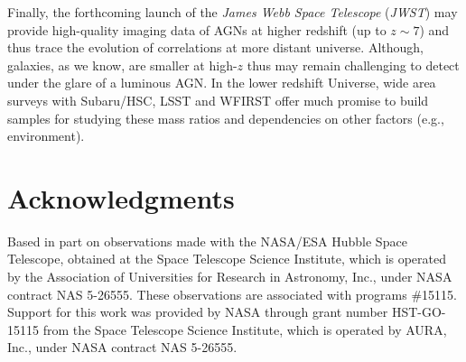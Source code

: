 \documentclass[apj]{emulateapj}
\begin{document}
Finally, the forthcoming launch of the {\it James Webb Space Telescope} ({\it JWST}) may provide high-quality imaging data of AGNs at higher redshift (up to $z\sim7$) and thus trace the evolution of correlations at more distant universe. Although, galaxies, as we know, are smaller at high-$z$ thus may remain challenging to detect under the glare of a luminous AGN. In the lower redshift Universe, wide area surveys with Subaru/HSC, LSST and WFIRST offer much promise to build samples for studying these mass ratios and dependencies on other factors (e.g., environment).  



%

\section*{Acknowledgments}
Based in part on observations made with the NASA/ESA Hubble Space Telescope, obtained at the Space Telescope Science Institute, which is operated by the Association of Universities for Research in Astronomy, Inc., under NASA contract NAS 5-26555. These observations are associated with programs
\#15115. Support for this work was provided by NASA through grant number HST-GO-15115 from the Space Telescope Science Institute, which is operated by AURA, Inc., under NASA contract NAS 5-26555.
\end{document}
